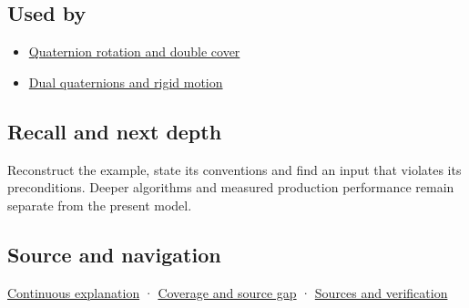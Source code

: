 \subsection{Used by}\label{appendix-965d9260eeab-used-by}

\hypertarget{appendix-965d9260eeab-used-by}{}

\begin{itemize}
\tightlist
\item
  \hyperref[appendix-8e61ab68f6b2]{Quaternion rotation and double cover}
\item
  \hyperref[appendix-d1ea57347893]{Dual quaternions and rigid motion}
\end{itemize}

\subsection{Recall and next depth}\label{appendix-965d9260eeab-recall-and-next-depth}

\hypertarget{appendix-965d9260eeab-recall-and-next-depth}{}

Reconstruct the example, state its conventions and find an input that violates its preconditions. Deeper algorithms and measured production performance remain separate from the present model.

\subsection{Source and navigation}\label{appendix-965d9260eeab-source-and-navigation}

\hypertarget{appendix-965d9260eeab-source-and-navigation}{}

\hyperref[01-foundations-i-ch018-keep-the-promises-visible-while-moving-between-representations]{Continuous explanation} · \hyperref[appendix-fd090d982a15-phase-7---parts-601-700]{Coverage and source gap} · \hyperref[appendix-a103e7846d21-phase-7---source-analysis-and-verification]{Sources and verification}
